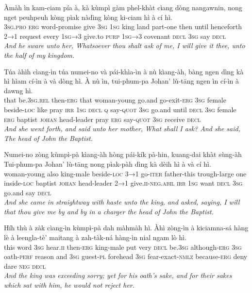 \documentclass[11pt,a4paper]{article}
\begin{document}
\begin{exe}
\gll Àmàh ìn kam-ciam pía à, kà kùmpì gàm phel-khàt cìang dòng nangawnin, nong nget peuhpeuh kòng pìak nàdìng kòng ki-ciam hì à cí hì. \\
     \textsc{3sg}.\textsc{pro} \textsc{erg} word-promise give \textsc{3sg} \textsc{1sg} king land part-one then until henceforth \textsc{2→1} request every \textsc{1sg→3} give.to \textsc{purp} \textsc{1sg→3} covenant \textsc{decl} \textsc{3sg} say \textsc{decl} \\
\glt \textcolor{kjvcolor}{\textit{And he sware unto her, Whatsoever thou shalt ask of me, I will give it thee, unto the half of my kingdom.}}

\gll Túa àhìh cìang-ìn túa numei-no và pái-khìa-ìn à nù kìang-àh, bàng ngen dìng kà hì hìam cí-ìn à và dòng hì. À nù ìn, tui-phum-pa Johan' lù-tāng ngen ìn cí-ìn à dawng hì. \\
     that be.\textsc{3sg}.\textsc{rel} then-\textsc{erg} that woman-young go.and go-exit-\textsc{erg} \textsc{3sg} female beside-\textsc{loc} like pray \textsc{irr} \textsc{1sg} \textsc{decl} \textsc{q} say-\textsc{quot} \textsc{3sg} go.and until \textsc{decl} \textsc{3sg} female \textsc{erg} baptist \textsc{johan} head-leader pray \textsc{erg} say-\textsc{quot} \textsc{3sg} receive \textsc{decl} \\
\glt \textcolor{kjvcolor}{\textit{And she went forth, and said unto her mother, What shall I ask? And she said, The head of John the Baptist.}}

\gll Numei-no zòng kùmpì-pà kìang-àh hòng pái-kík pà-hin, kuang-dai khàt sùng-àh Tui-phum-pa Johan' lù-tāng nong pìak-pàh dìng kà dèih hì à và cí hì. \\
     woman-young also king-male beside-\textsc{loc} \textsc{3→1} go-\textsc{iter} father-this trough-large one inside-\textsc{loc} baptist \textsc{johan} head-leader \textsc{2→1} give.\textsc{ii}-\textsc{neg}.\textsc{abil} \textsc{irr} \textsc{1sg} want \textsc{decl} \textsc{3sg} go.and say \textsc{decl} \\
\glt \textcolor{kjvcolor}{\textit{And she came in straightway with haste unto the king, and asked, saying, I will that thou give me by and by in a charger the head of John the Baptist.}}

\gll Híh thù à zàk cìang-ìn kùmpì-pà dah màhmàh hì. Àhì zòng-ìn à kiciamna-sá hàng lè à leengla-tè' maitang à zah-tàk-ná hàng-ìn nial ngam lò hì. \\
     this word \textsc{3sg} hear.\textsc{ii} then-\textsc{erg} king-male put very \textsc{decl} be.\textsc{3sg} although-\textsc{erg} \textsc{3sg} oath-\textsc{perf} reason and \textsc{3sg} guest-\textsc{pl} forehead \textsc{3sg} fear-exact-\textsc{nmlz} because-\textsc{erg} deny dare \textsc{neg} \textsc{decl} \\
\glt \textcolor{kjvcolor}{\textit{And the king was exceeding sorry; yet for his oath's sake, and for their sakes which sat with him, he would not reject her.}}


\end{exe}
\end{document}
